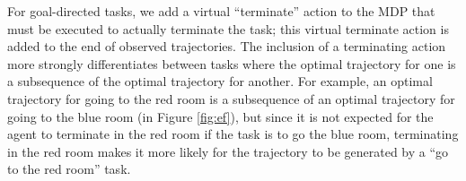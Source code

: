 \documentclass[conference]{IEEEtran}
\begin{document}

For goal-directed tasks, we add a virtual ``terminate'' action to the MDP that must be executed to actually terminate the task; this virtual terminate action is added to the end of observed trajectories. The inclusion of a terminating action more strongly differentiates between tasks where the optimal trajectory for one is a subsequence of the optimal trajectory for another. For example, an optimal trajectory for going to the red room is a subsequence of an optimal trajectory for going to the blue room (in Figure \ref{fig:ef}), but since it is not expected for the agent to terminate in the red room if the task is to go the blue room, terminating in the red room makes it more likely for the trajectory to be generated by a ``go to the red room'' task.

\end{document}
